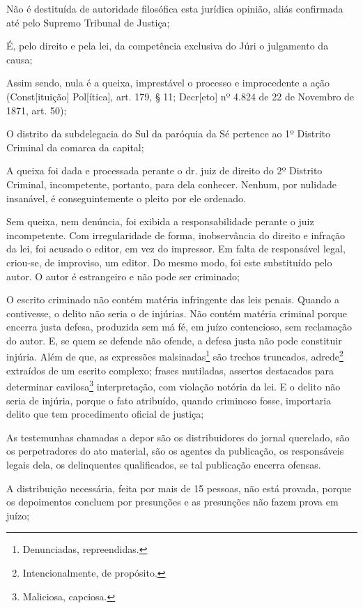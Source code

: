 Não é destituída de autoridade filosófica esta jurídica opinião, aliás
confirmada até pelo Supremo Tribunal de Justiça;

É, pelo direito e pela lei, da competência exclusiva do Júri o
julgamento da causa;

Assim sendo, nula é a queixa, imprestável o processo e improcedente a
ação (Const{[}ituição{]} Pol{[}ítica{]}, art. 179, § 11; Decr{[}eto{]}
nº 4.824 de 22 de Novembro de 1871, art. 50);

O distrito da subdelegacia do Sul da paróquia da Sé pertence ao 1º
Distrito Criminal da comarca da capital;

A queixa foi dada e processada perante o dr. juiz de direito do 2º
Distrito Criminal, incompetente, portanto, para dela conhecer. Nenhum,
por nulidade insanável, é conseguintemente o pleito por ele ordenado.

Sem queixa, nem denúncia, foi exibida a responsabilidade perante o juiz
incompetente. Com irregularidade de forma, inobservância do direito e
infração da lei, foi acusado o editor, em vez do impressor. Em falta de
responsável legal, criou-se, de improviso, um editor. Do mesmo modo, foi
este substituído pelo autor. O autor é estrangeiro e não pode ser
criminado;

O escrito criminado não contém matéria infringente das leis penais.
Quando a contivesse, o delito não seria o de injúrias. Não contém
matéria criminal porque encerra justa defesa, produzida sem má fé, em
juízo contencioso, sem reclamação do autor. E, se quem se defende não
ofende, a defesa justa não pode constituir injúria. Além de que, as
expressões malsinadas\footnote{Denunciadas, repreendidas.} são trechos
truncados, adrede\footnote{Intencionalmente, de propósito.} extraídos de
um escrito complexo; frases mutiladas, assertos destacados para
determinar cavilosa\footnote{Maliciosa, capciosa.} interpretação, com
violação notória da lei. E o delito não seria de injúria, porque o fato
atribuído, quando criminoso fosse, importaria delito que tem
procedimento oficial de justiça;

As testemunhas chamadas a depor são os distribuidores do jornal
querelado, são os perpetradores do ato material, são os agentes da
publicação, os responsáveis legais dela, os delinquentes qualificados,
se tal publicação encerra ofensas.

A distribuição necessária, feita por mais de 15 pessoas, não está
provada, porque os depoimentos concluem por presunções e as presunções
não fazem prova em juízo;


